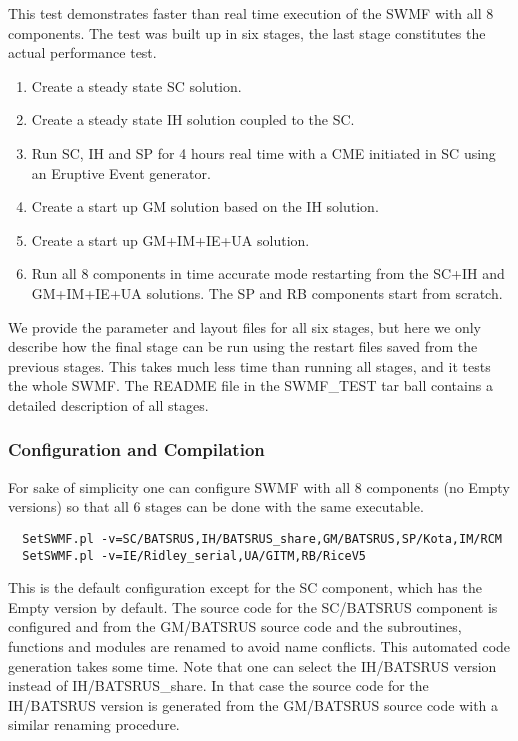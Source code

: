 This test demonstrates faster than real time execution of the
SWMF with all 8 components. The test was built up in six stages,
the last stage constitutes the actual performance test.
\begin{enumerate}
\item Create a steady state SC solution.
\item Create a steady state IH solution coupled to the SC.
\item Run SC, IH and SP for 4 hours real time with 
      a CME initiated in SC using an Eruptive Event generator.
\item Create a start up GM solution based on the IH solution.
\item Create a start up GM+IM+IE+UA solution.
\item Run all 8 components in time accurate mode restarting from the
      SC+IH and GM+IM+IE+UA solutions. 
      The SP and RB components start from scratch.
\end{enumerate}
We provide the parameter and layout files for all six stages,
but here we only describe how the final stage can be run using
the restart files saved from the previous stages.
This takes much less time than running all stages, 
and it tests the whole SWMF. The README file in the SWMF\_TEST
tar ball contains a detailed description of all stages.

\subsubsection{Configuration and Compilation}

For sake of simplicity one can configure SWMF with all 8 components
(no Empty versions) so that all 6 stages can be done with the same
executable. 
\begin{verbatim}
  SetSWMF.pl -v=SC/BATSRUS,IH/BATSRUS_share,GM/BATSRUS,SP/Kota,IM/RCM
  SetSWMF.pl -v=IE/Ridley_serial,UA/GITM,RB/RiceV5
\end{verbatim}
This is the default configuration except for the SC
component, which has the Empty version by default.
The source code for the SC/BATSRUS component is configured and 
from the GM/BATSRUS source code and the subroutines, functions and 
modules are renamed to avoid name conflicts. This automated code
generation takes some time.
Note that one can select the IH/BATSRUS version instead of IH/BATSRUS\_share.
In that case the source code for the IH/BATSRUS version is generated 
from the GM/BATSRUS source code with a similar renaming procedure.

